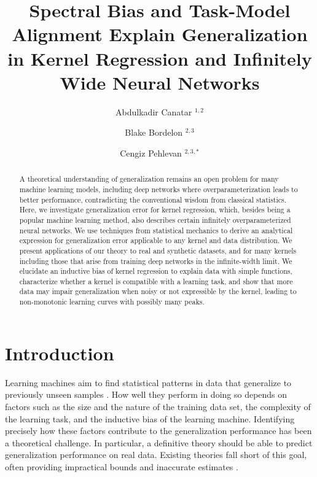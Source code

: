 \documentclass[11pt]{article}
\title{Spectral Bias and Task-Model Alignment Explain Generalization in Kernel Regression and Infinitely Wide Neural Networks}
\author{
  Abdulkadir Canatar $^{1,2}$ %
  \and
  Blake Bordelon $^{2,3}$%
  \and
  Cengiz Pehlevan $^{2,3,*}$}
\date{}
\renewcommand{\thefootnote}{\fnsymbol{footnote}}
\begin{document}
\maketitle

\renewcommand*{\thefootnote}{\arabic{footnote}}
\renewcommand*{\thefootnote}{\fnsymbol{footnote}}

\renewcommand{\figurename}{Fig.}
\renewcommand{\figref}[2][]{{{\figurename\,\ref{#2}#1}}}

\begin{abstract}
A theoretical understanding of generalization remains an open problem for many machine learning models, including deep networks where overparameterization leads to better performance, contradicting the conventional wisdom from classical statistics. Here, we investigate generalization error for kernel regression, which, besides being a popular machine learning method, also describes certain infinitely overparameterized neural networks. We use techniques from statistical mechanics to derive an analytical expression for generalization error applicable to any kernel and data distribution. We present applications of our theory to real and synthetic datasets, and for many kernels including those that arise from training deep networks in the infinite-width limit. We elucidate an inductive bias of kernel regression to explain data with simple functions, characterize whether a kernel is compatible with a learning task, and show that more data may impair generalization when noisy or not expressible by the kernel, leading to non-monotonic learning curves with possibly many peaks. 
\end{abstract}


\newpage

\section*{Introduction}

Learning machines aim to find statistical patterns in data that generalize to previously unseen samples \cite{hastie2009elements}. How well they perform in doing so depends on factors such as the size and the nature of the training data set, the complexity of the learning task, and the inductive bias of the learning machine. Identifying precisely how these factors contribute to the generalization performance has been a theoretical challenge. In particular, a definitive theory should be able to predict generalization performance on real data. Existing theories fall short of this goal, often providing impractical bounds and inaccurate estimates \cite{zhang2016understanding,belkin2019reconciling}. 
\end{document}
